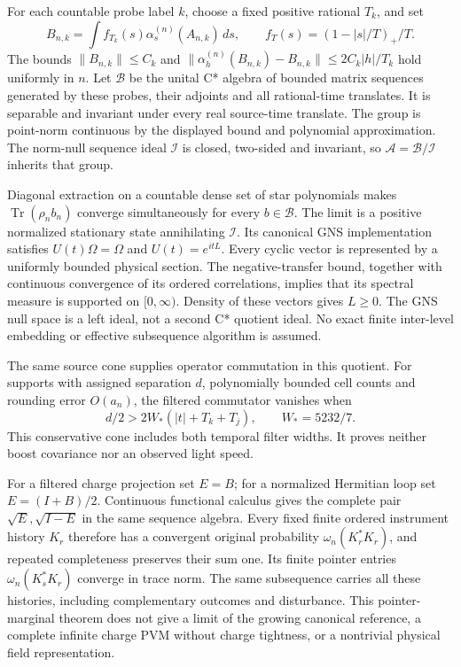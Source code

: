 For each countable probe label $k$, choose a fixed positive rational $T_k$,
and set
\[
 B_{n,k}=\int f_{T_k}(s)\alpha_s^{(n)}(A_{n,k})\,ds,
 \qquad f_T(s)=(1-|s|/T)_+/T.
\]
The bounds $\|B_{n,k}\|\le C_k$ and
$\|\alpha_h^{(n)}(B_{n,k})-B_{n,k}\|\le2C_k|h|/T_k$
hold uniformly in $n$. Let $\mathcal B$ be the unital C* algebra of
bounded matrix sequences generated by these probes, their adjoints and
all rational-time translates. It is separable and invariant under every
real source-time translate. The group is point-norm continuous by the
displayed bound and polynomial approximation. The norm-null sequence
ideal $\mathcal I$ is closed, two-sided and invariant, so
$\mathcal A=\mathcal B/\mathcal I$ inherits that group.

Diagonal extraction on a countable dense set of star polynomials makes
$\operatorname{Tr}(\rho_n b_n)$ converge simultaneously for every
$b\in\mathcal B$. The limit is a positive normalized stationary state
annihilating $\mathcal I$. Its canonical GNS implementation satisfies
$U(t)\Omega=\Omega$ and $U(t)=e^{itL}$. Every cyclic vector is represented
by a uniformly bounded physical section. The negative-transfer bound,
together with continuous convergence of its ordered correlations, implies
that its spectral measure is supported on $[0,\infty)$. Density of these
vectors gives $L\ge0$. The GNS null space is a left ideal, not a second
C* quotient ideal. No exact finite inter-level embedding or effective
subsequence algorithm is assumed.

The same source cone supplies operator commutation in this quotient.
For supports with assigned separation $d$, polynomially bounded cell
counts and rounding error $O(a_n)$, the filtered commutator vanishes
when
\[
 d/2>2W_*(|t|+T_k+T_j),\qquad W_*=5232/7.
\]
This conservative cone includes both temporal filter widths. It proves
neither boost covariance nor an observed light speed.

For a filtered charge projection set $E=B$; for a normalized Hermitian
loop set $E=(I+B)/2$. Continuous functional calculus gives the complete
pair $\sqrt E,\sqrt{I-E}$ in the same sequence algebra. Every fixed
finite ordered instrument history $K_r$ therefore has a convergent
original probability $\omega_n(K_r^*K_r)$, and repeated completeness
preserves their sum one. Its finite pointer entries
$\omega_n(K_s^*K_r)$ converge in trace norm. The same subsequence carries
all these histories, including complementary outcomes and disturbance.
This pointer-marginal theorem does not give a limit of the growing
canonical reference, a complete infinite charge PVM without charge
tightness, or a nontrivial physical field representation.

